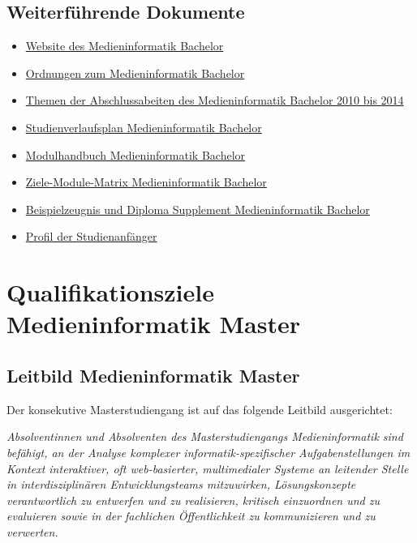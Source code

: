 \subsection{Weiterführende
Dokumente}\label{weiterfuxfchrende-dokumente}

\begin{itemize}
\tightlist
\item
  \href{https://www.th-koeln.de/studium/medieninformatik-bachelor_2379.php}{Website
  des Medieninformatik Bachelor}
\item
  \href{https://www.th-koeln.de/studium/medieninformatik-bachelor--ordnungen-und-formulare_3963.php}{Ordnungen
  zum Medieninformatik Bachelor}
\item
  \href{https://th-koeln.github.io/mi-2017/anhaenge/ba-abschlussarbeiten_2010-2014_.pdf}{Themen der
  Abschlussabeiten des Medieninformatik Bachelor 2010 bis 2014}
\item
  \href{https://th-koeln.github.io/mi-2017/anhaenge/ba-studienverlaufsplan.pdf}{Studienverlaufsplan
  Medieninformatik Bachelor}
\item
  \href{../download/modulbeschreibungen-bachelor.pdf}{Modulhandbuch
  Medieninformatik Bachelor}
\item
  \href{https://th-koeln.github.io/mi-2017/anhaenge/ba-Ziele-Module-Matrix-Medieninformatik-Bachelor.pdf}{Ziele-Module-Matrix
  Medieninformatik Bachelor}
\item
  \href{https://th-koeln.github.io/mi-2017/anhaenge/ba-zeugnis.pdf}{Beispielzeugnis und Diploma
  Supplement Medieninformatik Bachelor}
\item
  \href{https://th-koeln.github.io/mi-2017/anhaenge/stat-profil-studienanfaenger-2017.pdf}{Profil der
  Studienanfänger}
\end{itemize}

\section{Qualifikationsziele Medieninformatik
Master}\label{qualifikationsziele-medieninformatik-master}

\subsection{Leitbild Medieninformatik
Master}\label{leitbild-medieninformatik-master}

Der konsekutive Masterstudiengang ist auf das folgende Leitbild
ausgerichtet:

\emph{Absolventinnen und Absolventen des Masterstudiengangs
Medieninformatik sind befähigt, an der Analyse komplexer
informatik-spezifischer Aufgabenstellungen im Kontext interaktiver, oft
web-basierter, multimedialer Systeme an leitender Stelle in
interdisziplinären Entwicklungsteams mitzuwirken, Lösungskonzepte
verantwortlich zu entwerfen und zu realisieren, kritisch einzuordnen und
zu evaluieren sowie in der fachlichen Öffentlichkeit zu kommunizieren
und zu verwerten.}

